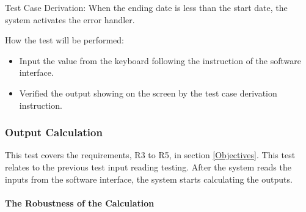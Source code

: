 \documentclass[12pt, titlepage]{article}
\begin{document}
\begin{enumerate}

Test Case Derivation: When the ending date is less than the start date, the system
activates the error handler. \\



How the test will be performed: 

\begin{itemize} 
\item Input the value from the keyboard following the instruction of the
software interface. 
\item Verified the output showing on the screen by the test case derivation
instruction.
\end{itemize} 
\end{enumerate}

\subsubsection{Output Calculation}

This test covers the requirements, R3 to R5, in section \ref{Objectives}.
This test relates to the previous test input reading testing. After the 
system reads the inputs from the software interface, the system starts
calculating the outputs.



\paragraph{The Robustness of the Calculation}
\end{document}
